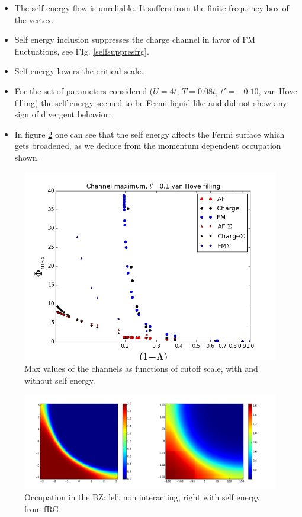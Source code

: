 \begin{itemize}

\item The self-energy flow is unreliable. It suffers from the finite frequency box of the vertex. 

\item Self energy inclusion suppresses the charge channel in favor of FM fluctuations, see FIg. \ref{selfsuppresfrg}. 

\item Self energy lowers the critical scale.

\item For the set of parameters considered ($U=4t$, $T=0.08t$, $t'=-0.10$, van Hove filling) the self energy seemed to be Fermi liquid like and did not show any sign of divergent behavior. 

\item In figure \ref{fermisurface} one can see that the self energy affects the Fermi surface which gets broadened, as we deduce from the momentum dependent occupation shown. 

\end{itemize}

\begin{figure}
\includegraphics[scale=0.7]{images/sevsnose.png}
\caption{Max values of the channels as functions of cutoff scale, with and without self energy. }
\label{selfsuppressfrg}
 \end{figure}
 
 \begin{figure}
 \includegraphics[scale=0.3]{images/Fermi_occupation_sevsnose.png}
 \caption{Occupation in the BZ: left non interacting, right with self energy from fRG.}
\label{fermisurface}
 \end{figure}
